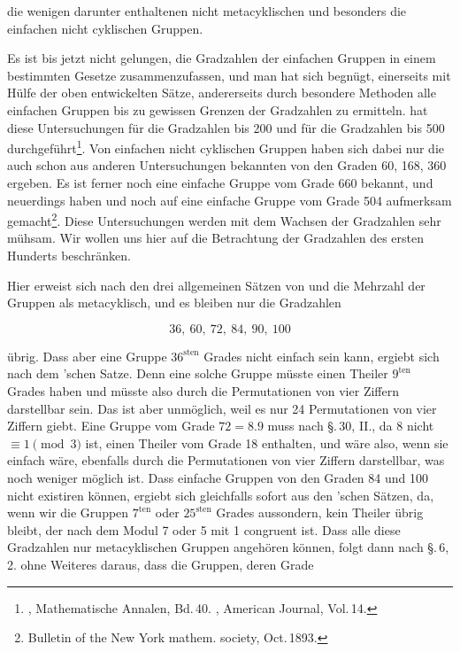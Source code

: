 die wenigen darunter enthaltenen nicht metacyklischen und besonders die einfachen nicht cyklischen Gruppen.

Es ist bis jetzt nicht gelungen, die Gradzahlen der einfachen Gruppen in einem bestimmten Gesetze zusammenzufassen, und man hat sich begnügt, einerseits mit Hülfe der oben entwickelten Sätze, andererseits durch besondere Methoden alle einfachen Gruppen bis zu gewissen Grenzen der Gradzahlen zu ermitteln.  hat diese Untersuchungen für die Gradzahlen bis 200 und  für die Gradzahlen bis 500 durchgeführt\footnote{, Mathematische Annalen, Bd.\,40. , American Journal, Vol.\,14.}. Von einfachen nicht cyklischen Gruppen haben sich dabei nur die auch schon aus anderen Untersuchungen bekannten von den Graden 60, 168, 360 ergeben. Es ist ferner noch eine einfache Gruppe vom Grade 660 bekannt, und neuerdings haben  und  noch auf eine einfache Gruppe vom Grade 504 aufmerksam gemacht\footnote{Bulletin of the New York mathem. society, Oct.\,1893.}. Diese Untersuchungen werden mit dem Wachsen der Gradzahlen sehr mühsam. Wir wollen uns hier auf die Betrachtung der Gradzahlen des ersten Hunderts beschränken.

Hier erweist sich nach den drei allgemeinen Sätzen von  und  die Mehrzahl der Gruppen als metacyklisch, und es bleiben nur die Gradzahlen

\[ 36,\ 60,\ 72,\ 84,\ 90,\ 100 \]

übrig. Dass aber eine Gruppe $36^{\mathrm{sten}}$ Grades nicht einfach sein kann, ergiebt sich nach dem 'schen Satze. Denn eine solche Gruppe müsste einen Theiler $9^{\mathrm{ten}}$ Grades haben und müsste also durch die Permutationen von vier Ziffern darstellbar sein. Das ist aber unmöglich, weil es nur 24 Permutationen von vier Ziffern giebt. Eine Gruppe vom Grade $72 = 8 . 9$ muss nach \S.\,30, II., da 8 nicht $\equiv 1 \pmod{3}$ ist, einen Theiler vom Grade 18 enthalten, und wäre also, wenn sie einfach wäre, ebenfalls durch die Permutationen von vier Ziffern darstellbar, was noch weniger möglich ist. Dass einfache Gruppen von den Graden 84 und 100 nicht existiren können, ergiebt sich gleichfalls sofort aus den 'schen Sätzen, da, wenn wir die Gruppen $7^{\mathrm{ten}}$ oder $25^{\mathrm{sten}}$ Grades aussondern, kein Theiler übrig bleibt, der nach dem Modul 7 oder 5 mit 1 congruent ist. Dass alle diese Gradzahlen nur metacyklischen Gruppen angehören können, folgt dann nach \S.\,6, 2. ohne Weiteres daraus, dass die Gruppen, deren Grade
